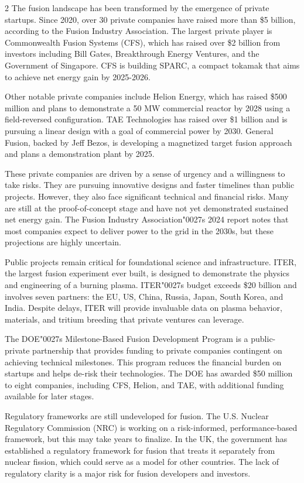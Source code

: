 \documentclass[10pt,a4paper]{article}
\newcommand{\BOApos}{{\BOQuoteFont\char"0027}}
\begin{document}
\begin{multicols}{2}
{\small The fusion landscape has been transformed by the emergence of private startups. Since 2020, over 30 private companies have raised more than \$5 billion, according to the Fusion Industry Association. The largest private player is Commonwealth Fusion Systems (CFS), which has raised over \$2 billion from investors including Bill Gates, Breakthrough Energy Ventures, and the Government of Singapore. CFS is building SPARC, a compact tokamak that aims to achieve net energy gain by 2025-2026.}\par
{\small Other notable private companies include Helion Energy, which has raised \$500 million and plans to demonstrate a 50 MW commercial reactor by 2028 using a field-reversed configuration. TAE Technologies has raised over \$1 billion and is pursuing a linear design with a goal of commercial power by 2030. General Fusion, backed by Jeff Bezos, is developing a magnetized target fusion approach and plans a demonstration plant by 2025.}\par
{\small These private companies are driven by a sense of urgency and a willingness to take risks. They are pursuing innovative designs and faster timelines than public projects. However, they also face significant technical and financial risks. Many are still at the proof-of-concept stage and have not yet demonstrated sustained net energy gain. The Fusion Industry Association\BOApos{}s 2024 report notes that most companies expect to deliver power to the grid in the 2030s, but these projections are highly uncertain.}\par
{\small Public projects remain critical for foundational science and infrastructure. ITER, the largest fusion experiment ever built, is designed to demonstrate the physics and engineering of a burning plasma. ITER\BOApos{}s budget exceeds \$20 billion and involves seven partners: the EU, US, China, Russia, Japan, South Korea, and India. Despite delays, ITER will provide invaluable data on plasma behavior, materials, and tritium breeding that private ventures can leverage.}\par
{\small The DOE\BOApos{}s Milestone-Based Fusion Development Program is a public-private partnership that provides funding to private companies contingent on achieving technical milestones. This program reduces the financial burden on startups and helps de-risk their technologies. The DOE has awarded \$50 million to eight companies, including CFS, Helion, and TAE, with additional funding available for later stages.}\par
{\small Regulatory frameworks are still undeveloped for fusion. The U.S. Nuclear Regulatory Commission (NRC) is working on a risk-informed, performance-based framework, but this may take years to finalize. In the UK, the government has established a regulatory framework for fusion that treats it separately from nuclear fission, which could serve as a model for other countries. The lack of regulatory clarity is a major risk for fusion developers and investors.}\par
\end{multicols}
\label{chap:4:end}
\end{document}
